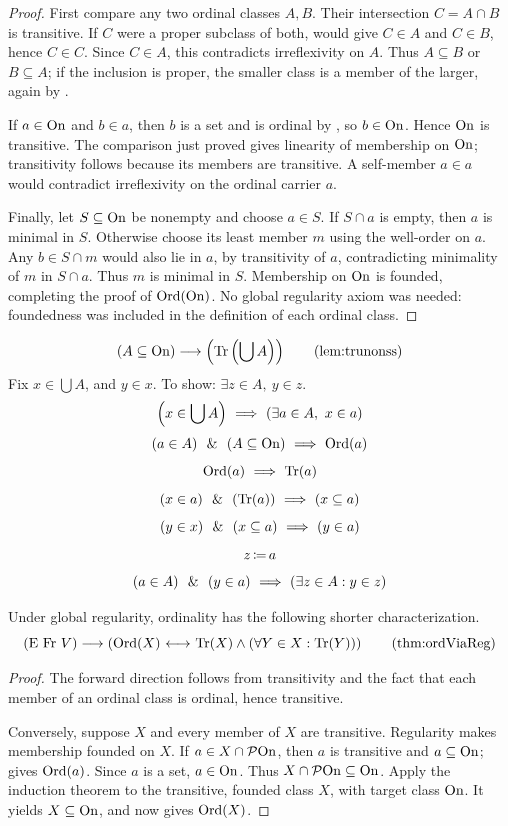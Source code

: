 \begin{proof}
First compare any two ordinal classes $A,B$. Their intersection
$C=A\cap B$ is transitive. If $C$ were a proper subclass of both,
 would give $C\in A$ and $C\in B$, hence $C\in C$.
Since $C\in A$, this contradicts irreflexivity on $A$. Thus $A\subseteq B$
or $B\subseteq A$; if the inclusion is proper, the smaller class is a
member of the larger, again by .

If $a\in\mathrm{On}$ and $b\in a$, then $b$ is a set and is ordinal by
, so $b\in\mathrm{On}$. Hence $\mathrm{On}$ is transitive.
The comparison just proved gives linearity of membership on $\mathrm{On}$;
transitivity follows because its members are transitive. A self-member
$a\in a$ would contradict irreflexivity on the ordinal carrier $a$.

Finally, let $S\subseteq\mathrm{On}$ be nonempty and choose $a\in S$.
If $S\cap a$ is empty, then $a$ is minimal in $S$. Otherwise choose
its least member $m$ using the well-order on $a$. Any $b\in S\cap m$
would also lie in $a$, by transitivity of $a$, contradicting minimality
of $m$ in $S\cap a$. Thus $m$ is minimal in $S$. Membership on $\mathrm{On}$
is founded, completing the proof of $\mathrm{Ord}(\mathrm{On})$. No global regularity
axiom was needed: foundedness was included in the definition of each
ordinal class.
\end{proof}

\begin{lemma}
\[
(A\subclass\On)
\implies
\left(\Tr\left(\union A\right)\right)
\labeltagd{lem}{trunonss}
\]
\Proof
Fix $x\in\bigcup A$, and $y\in x$. To show: $\exists z\in A,\ y\in z$.
\[
\left(x\in\bigcup A\right)
\ \Longrightarrow\ 
(\exists a\in A,\ x\in a)
\]
\[
(a\in A)
\ \ \&\ \ 
(A\subseteq\mathrm{On})
\ \Longrightarrow\ 
\mathrm{Ord}(a)
\]
\[
\mathrm{Ord}(a)
\ \Longrightarrow\ 
{\textrm{Tr}}(a)
\]
\[
(x\in a)
\ \ \&\ \ 
({\textrm{Tr}}(a))
\ \Longrightarrow\ 
(x\subseteq a)
\]
\[
(y\in x)
\ \ \&\ \ 
(x\subseteq a)
\ \Longrightarrow\ 
(y\in a)
\]
\[
z\,{\coloneqq}\, a
\]
\[
(a\in A)
\ \ \&\ \ 
(y\in a)
\ \Longrightarrow\ 
(\exists z\in A:y\in z)
\]
\Done
\end{lemma}



\begin{theorem}
Under global regularity, ordinality has the following shorter characterization.
\[
(\E\mathrm{\ Fr\ }V)
\implies
\left(
\Ord(X) \iff \Tr(X)\land (\forall Y\in X: \Tr(Y))
\right)
\labeltagd{thm}{ordViaReg}
\]
\end{theorem}
\begin{proof}
The forward direction follows from transitivity and the fact that each
member of an ordinal class is ordinal, hence transitive.

Conversely, suppose $X$ and every member of $X$ are transitive.
Regularity makes membership founded on $X$. If
$a\in X\cap\mathcal{P}\mathrm{On}$, then $a$ is transitive and $a\subseteq\mathrm{On}$;
 gives $\mathrm{Ord}(a)$. Since $a$ is a set, $a\in\mathrm{On}$.
Thus $X\cap\mathcal{P}\mathrm{On}\subseteq\mathrm{On}$. Apply the induction theorem
 to the transitive, founded class $X$, with target class
$\mathrm{On}$. It yields $X\subseteq\mathrm{On}$, and  now gives
$\mathrm{Ord}(X)$.
\end{proof}

